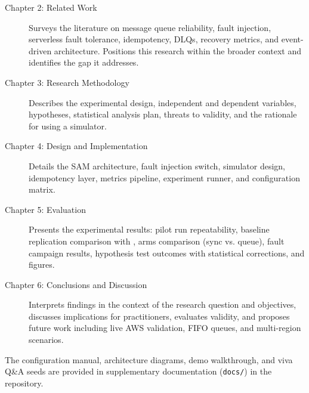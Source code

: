 \begin{description}
    \item[Chapter 2: Related Work] Surveys the literature on message queue reliability, fault injection, serverless fault tolerance, idempotency, DLQs, recovery metrics, and event-driven architecture. Positions this research within the broader context and identifies the gap it addresses.
    
    \item[Chapter 3: Research Methodology] Describes the experimental design, independent and dependent variables, hypotheses, statistical analysis plan, threats to validity, and the rationale for using a simulator.
    
    \item[Chapter 4: Design and Implementation] Details the SAM architecture, fault injection switch, simulator design, idempotency layer, metrics pipeline, experiment runner, and configuration matrix.
    
    \item[Chapter 5: Evaluation] Presents the experimental results: pilot run repeatability, baseline replication comparison with \citet{Kyrychenko2025}, arms comparison (sync vs. queue), fault campaign results, hypothesis test outcomes with statistical corrections, and figures.
    
    \item[Chapter 6: Conclusions and Discussion] Interprets findings in the context of the research question and objectives, discusses implications for practitioners, evaluates validity, and proposes future work including live AWS validation, FIFO queues, and multi-region scenarios.
\end{description}

The configuration manual, architecture diagrams, demo walkthrough, and viva Q\&A seeds are provided in supplementary documentation (\texttt{docs/}) in the repository.
